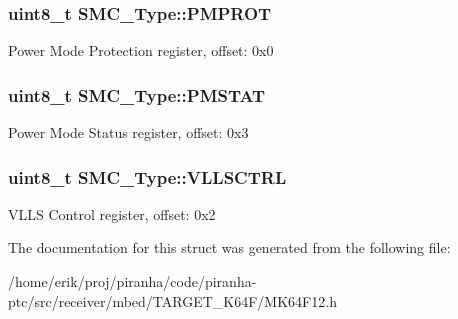 \subsubsection[{\texorpdfstring{P\+M\+P\+R\+OT}{PMPROT}}]{ uint8\+\_\+t S\+M\+C\+\_\+\+Type\+::\+P\+M\+P\+R\+OT}\hypertarget{structSMC__Type_aeb1160606f3387d12dadc263eec7b749}{}\label{structSMC__Type_aeb1160606f3387d12dadc263eec7b749}
Power Mode Protection register, offset\+: 0x0 
\subsubsection[{\texorpdfstring{P\+M\+S\+T\+AT}{PMSTAT}}]{ uint8\+\_\+t S\+M\+C\+\_\+\+Type\+::\+P\+M\+S\+T\+AT}\hypertarget{structSMC__Type_af4f12c170087f5adb138c07010fc7027}{}\label{structSMC__Type_af4f12c170087f5adb138c07010fc7027}
Power Mode Status register, offset\+: 0x3 
\subsubsection[{\texorpdfstring{V\+L\+L\+S\+C\+T\+RL}{VLLSCTRL}}]{ uint8\+\_\+t S\+M\+C\+\_\+\+Type\+::\+V\+L\+L\+S\+C\+T\+RL}\hypertarget{structSMC__Type_ac5c2b5e99d8d45dbf2e21d8ebd2b4c9a}{}\label{structSMC__Type_ac5c2b5e99d8d45dbf2e21d8ebd2b4c9a}
V\+L\+LS Control register, offset\+: 0x2 

The documentation for this struct was generated from the following file\+:\begin{DoxyCompactItemize}
\item 
/home/erik/proj/piranha/code/piranha-\/ptc/src/receiver/mbed/\+T\+A\+R\+G\+E\+T\+\_\+\+K64\+F/M\+K64\+F12.\+h\end{DoxyCompactItemize}
